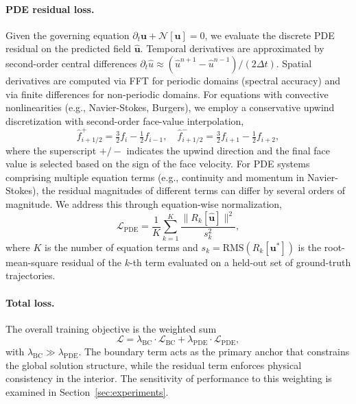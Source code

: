 \documentclass{article}
\begin{document}
\paragraph{PDE residual loss.}
Given the governing equation $\partial_t \mathbf{u} + \mathcal{N}[\mathbf{u}] = 0$, we evaluate the discrete PDE residual on the predicted field $\hat{\mathbf{u}}$. Temporal derivatives are approximated by second-order central differences $\partial_t \hat{u} \approx (\hat{u}^{n+1} - \hat{u}^{n-1}) / (2\Delta t)$. Spatial derivatives are computed via FFT for periodic domains (spectral accuracy) and via finite differences for non-periodic domains. For equations with convective nonlinearities (e.g., Navier-Stokes, Burgers), we employ a conservative upwind discretization with second-order face-value interpolation,
\begin{equation}
\hat{f}_{i+1/2}^{+} = \tfrac{3}{2} f_i - \tfrac{1}{2} f_{i-1}, \quad
\hat{f}_{i+1/2}^{-} = \tfrac{3}{2} f_{i+1} - \tfrac{1}{2} f_{i+2},
\end{equation}
where the superscript $+/-$ indicates the upwind direction and the final face value is selected based on the sign of the face velocity. For PDE systems comprising multiple equation terms (e.g., continuity and momentum in Navier-Stokes), the residual magnitudes of different terms can differ by several orders of magnitude. We address this through equation-wise normalization,
\begin{equation}
\mathcal{L}_{\mathrm{PDE}} = \frac{1}{K} \sum_{k=1}^{K} \frac{\|R_k[\hat{\mathbf{u}}]\|^2}{s_k^2},
\end{equation}
where $K$ is the number of equation terms and $s_k = \mathrm{RMS}(R_k[\mathbf{u}^*])$ is the root-mean-square residual of the $k$-th term evaluated on a held-out set of ground-truth trajectories.

\paragraph{Total loss.}
The overall training objective is the weighted sum
\begin{equation}
\mathcal{L} = \lambda_{\mathrm{BC}} \cdot \mathcal{L}_{\mathrm{BC}} + \lambda_{\mathrm{PDE}} \cdot \mathcal{L}_{\mathrm{PDE}},
\end{equation}
with $\lambda_{\mathrm{BC}} \gg \lambda_{\mathrm{PDE}}$. The boundary term acts as the primary anchor that constrains the global solution structure, while the residual term enforces physical consistency in the interior. The sensitivity of performance to this weighting is examined in Section~\ref{sec:experiments}.
\end{document}
